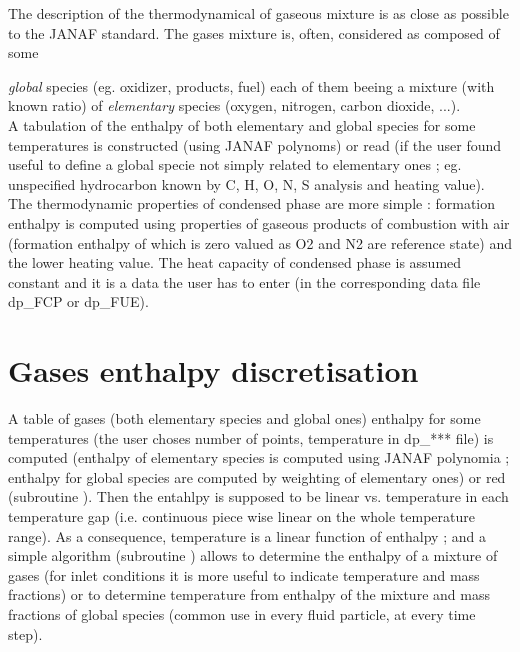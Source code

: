 The description of the thermodynamical of gaseous mixture is as close as
possible to the JANAF standard. The gases mixture is, often, considered as
composed of some {\textit{global} species (eg. oxidizer, products, fuel) each of
them beeing a mixture (with known ratio) of \textit{elementary} species
(oxygen, nitrogen, carbon dioxide, ...).\\

A tabulation of the enthalpy of both elementary and global species for some
temperatures is constructed (using JANAF polynoms) or read (if the user found
useful to define a global specie not simply related to elementary ones ;
eg. unspecified hydrocarbon known by C, H, O, N, S analysis and heating
value). The thermodynamic properties of condensed phase are more simple :
formation enthalpy is computed using properties of gaseous products of
combustion with air (formation enthalpy of which is zero valued as O2 and N2
are reference state) and the lower heating value. The heat capacity of
condensed phase is assumed constant and it is a data the user has to enter (in
the corresponding data file dp\_FCP or dp\_FUE).

\section*{Gases enthalpy discretisation}
 
A table of gases (both elementary species and global ones) enthalpy for some
temperatures (the user choses number of points, temperature in dp\_*** file) is
computed (enthalpy of elementary species is computed using JANAF polynomia ;
enthalpy for global species are computed by weighting of elementary ones) or red
(subroutine ). Then the entahlpy is supposed to be linear
vs. temperature in each temperature gap (i.e. continuous piece wise linear on
the whole temperature range). As a consequence, temperature is a linear function
of enthalpy ; and a simple algorithm (subroutine ) allows to
determine the enthalpy of a mixture of gases (for inlet conditions it is more
useful to indicate temperature and mass fractions) or to determine temperature
from enthalpy of the mixture and mass fractions of global species (common use in
every fluid particle, at every time step).
 
}
